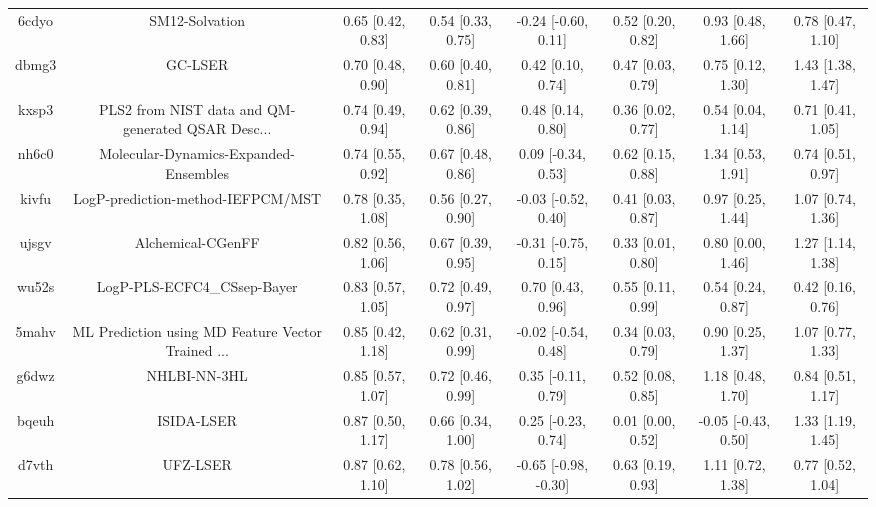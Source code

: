 \documentclass{article}
\begin{document}
\begin{center}
\begin{longtable}{|cccccccc|}
 6cdyo &                                     SM12-Solvation &  0.65 [0.42, 0.83] &  0.54 [0.33, 0.75] &   -0.24 [-0.60, 0.11] &  0.52 [0.20, 0.82] &    0.93 [0.48, 1.66] &     0.78 [0.47, 1.10] \\
 dbmg3 &                                            GC-LSER &  0.70 [0.48, 0.90] &  0.60 [0.40, 0.81] &     0.42 [0.10, 0.74] &  0.47 [0.03, 0.79] &    0.75 [0.12, 1.30] &     1.43 [1.38, 1.47] \\
 kxsp3 &  PLS2 from NIST data and QM-generated QSAR Desc... &  0.74 [0.49, 0.94] &  0.62 [0.39, 0.86] &     0.48 [0.14, 0.80] &  0.36 [0.02, 0.77] &    0.54 [0.04, 1.14] &     0.71 [0.41, 1.05] \\
 nh6c0 &              Molecular-Dynamics-Expanded-Ensembles &  0.74 [0.55, 0.92] &  0.67 [0.48, 0.86] &    0.09 [-0.34, 0.53] &  0.62 [0.15, 0.88] &    1.34 [0.53, 1.91] &     0.74 [0.51, 0.97] \\
 kivfu &                  LogP-prediction-method-IEFPCM/MST &  0.78 [0.35, 1.08] &  0.56 [0.27, 0.90] &   -0.03 [-0.52, 0.40] &  0.41 [0.03, 0.87] &    0.97 [0.25, 1.44] &     1.07 [0.74, 1.36] \\
 ujsgv &                                  Alchemical-CGenFF &  0.82 [0.56, 1.06] &  0.67 [0.39, 0.95] &   -0.31 [-0.75, 0.15] &  0.33 [0.01, 0.80] &    0.80 [0.00, 1.46] &     1.27 [1.14, 1.38] \\
 wu52s &                        LogP-PLS-ECFC4\_CSsep-Bayer &  0.83 [0.57, 1.05] &  0.72 [0.49, 0.97] &     0.70 [0.43, 0.96] &  0.55 [0.11, 0.99] &    0.54 [0.24, 0.87] &     0.42 [0.16, 0.76] \\
 5mahv &  ML Prediction using MD Feature Vector Trained ... &  0.85 [0.42, 1.18] &  0.62 [0.31, 0.99] &   -0.02 [-0.54, 0.48] &  0.34 [0.03, 0.79] &    0.90 [0.25, 1.37] &     1.07 [0.77, 1.33] \\
 g6dwz &                                       NHLBI-NN-3HL &  0.85 [0.57, 1.07] &  0.72 [0.46, 0.99] &    0.35 [-0.11, 0.79] &  0.52 [0.08, 0.85] &    1.18 [0.48, 1.70] &     0.84 [0.51, 1.17] \\
 bqeuh &                                         ISIDA-LSER &  0.87 [0.50, 1.17] &  0.66 [0.34, 1.00] &    0.25 [-0.23, 0.74] &  0.01 [0.00, 0.52] &  -0.05 [-0.43, 0.50] &     1.33 [1.19, 1.45] \\
 d7vth &                                           UFZ-LSER &  0.87 [0.62, 1.10] &  0.78 [0.56, 1.02] &  -0.65 [-0.98, -0.30] &  0.63 [0.19, 0.93] &    1.11 [0.72, 1.38] &     0.77 [0.52, 1.04] \\

\end{longtable}
\end{center}
\end{document}
